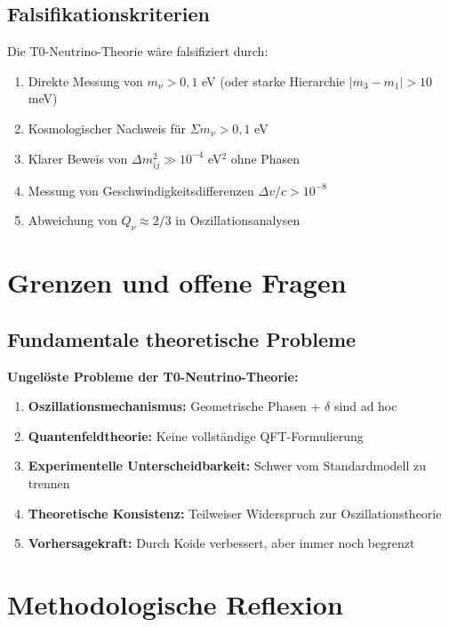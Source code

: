 	\subsection{Falsifikationskriterien}
	
	Die T0-Neutrino-Theorie wäre falsifiziert durch:
	\begin{enumerate}
		\item Direkte Messung von $m_\nu > 0,1$ eV (oder starke Hierarchie $|m_3 - m_1| > 10$ meV)
		\item Kosmologischer Nachweis für $\Sigma m_\nu > 0,1$ eV
		\item Klarer Beweis von $\Delta m^2_{ij} \gg 10^{-4}$ eV$^2$ ohne Phasen
		\item Messung von Geschwindigkeitsdifferenzen $\Delta v/c > 10^{-8}$
		\item Abweichung von $Q_\nu \approx 2/3$ in Oszillationsanalysen
	\end{enumerate}
	
	\section{Grenzen und offene Fragen}
	
	\subsection{Fundamentale theoretische Probleme}
	
	\begin{warning}
		\textbf{Ungelöste Probleme der T0-Neutrino-Theorie:}
		
		\begin{enumerate}
			\item \textbf{Oszillationsmechanismus:} Geometrische Phasen + $\delta$ sind ad hoc
			\item \textbf{Quantenfeldtheorie:} Keine vollständige QFT-Formulierung
			\item \textbf{Experimentelle Unterscheidbarkeit:} Schwer vom Standardmodell zu trennen
			\item \textbf{Theoretische Konsistenz:} Teilweiser Widerspruch zur Oszillationstheorie
			\item \textbf{Vorhersagekraft:} Durch Koide verbessert, aber immer noch begrenzt
		\end{enumerate}
	\end{warning}
	
	\section{Methodologische Reflexion}
	
